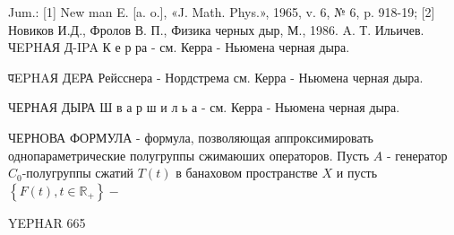 \documentclass[10pt]{article}
\begin{document}
Jum.: [1] New man E. [a. o.], «J. Math. Phys.», 1965, v. 6, № 6, p. 918-19; [2] Новиков И.Д., Фролов В. П., Физика черных дыр, М., 1986. A. Т. Ильичев. ЧEPHАЯ Д-IPA К е р ра - см. Керра - Ньюмена черная дыра.



पEPHAЯ ДEРА Рейсснера - Нордстрема см. Керра - Ньюмена черная дыра.



ЧЕРНАЯ ДЫРА Ш в а р ш и л ь а - см. Керра - Ньюмена черная дыра.



ЧЕРНОВА ФОРМУЛА - формула, позволяющая аппроксимировать однопараметрические полугруппы сжимаюших операторов. Пусть $A$ - генератор $C_{0}$-полугруппы сжатий $T(t)$ в банаховом пространстве $X$ и пусть $\left\{F(t), t \in \mathbb{R}_{+}\right\}-$



YEPHAR 665
\end{document}
